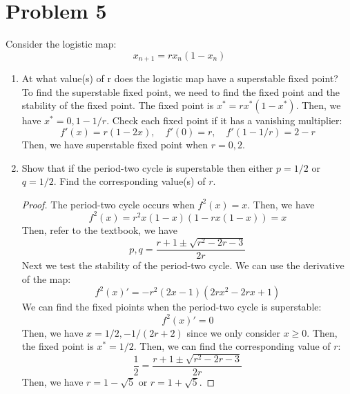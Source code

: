 \documentclass[12pt]{exam}
\begin{document}
\section*{Problem 5}
Consider the logistic map:
\[x_{n+1} = rx_n(1-x_n)\]

\begin{enumerate}
	\item At what value(s) of r does the logistic map have a superstable fixed point?\\
	To find the superstable fixed point, we need to find the fixed point and the stability of the fixed point. The fixed point is $x^* = rx^*(1-x^*)$. Then, we have $x^* = 0, 1-1/r$. Check each fixed point if it has a vanishing multiplier:
	\[ f'(x) = r(1-2x), \quad f'(0) = r, \quad f'(1-1/r) = 2-r \]
	Then, we have superstable fixed point when $r = 0,2$.

	\item Show that if the period-two cycle is superstable then either $p = 1/2$ or $q = 1/2$. Find the corresponding value(s) of $r$.
	\begin{proof}
	The period-two cycle occurs when $f^2(x) = x$. Then, we have
	\[ f^2(x) = r^2x(1-x)(1-rx(1-x)) = x \]
	Then, refer to the textbook, we have
	\[ p,q = \frac{r+1\pm \sqrt{r^2-2r-3}}{2r} \]
	Next we test the stability of the period-two cycle. We can use the derivative of the map:
	\[ f^2(x)' = -r^2(2x-1)(2rx^2-2rx+1) \]
	We can find the fixed pioints when the period-two cycle is superstable:
	\[ f^2(x)' = 0 \]
	Then, we have $x = 1/2, -1/(2r+2)$ since we only consider $x \geq 0$. Then, the fixed point is $x^* = 1/2$. Then, we can find the corresponding value of $r$:
	\[ \frac{1}{2} = \frac{r+1\pm \sqrt{r^2-2r-3}}{2r} \]
	Then, we have $r = 1-\sqrt{5}$ or $r = 1+\sqrt{5}$.
	\end{proof}


\end{enumerate}
\end{document}
